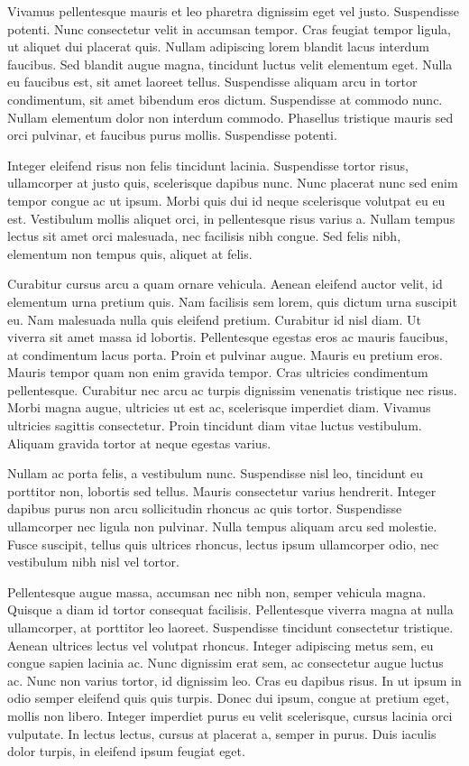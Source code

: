 \documentclass[twoside]{article}
\begin{document}
Vivamus pellentesque mauris et leo pharetra dignissim eget vel justo. Suspendisse potenti. Nunc consectetur velit in accumsan tempor. Cras feugiat tempor ligula, ut aliquet dui placerat quis. Nullam adipiscing lorem blandit lacus interdum faucibus. Sed blandit augue magna, tincidunt luctus velit elementum eget. Nulla eu faucibus est, sit amet laoreet tellus. Suspendisse aliquam arcu in tortor condimentum, sit amet bibendum eros dictum. Suspendisse at commodo nunc. Nullam elementum dolor non interdum commodo. Phasellus tristique mauris sed orci pulvinar, et faucibus purus mollis. Suspendisse potenti.

Integer eleifend risus non felis tincidunt lacinia. Suspendisse tortor risus, ullamcorper at justo quis, scelerisque dapibus nunc. Nunc placerat nunc sed enim tempor congue ac ut ipsum. Morbi quis dui id neque scelerisque volutpat eu eu est. Vestibulum mollis aliquet orci, in pellentesque risus varius a. Nullam tempus lectus sit amet orci malesuada, nec facilisis nibh congue. Sed felis nibh, elementum non tempus quis, aliquet at felis.

Curabitur cursus arcu a quam ornare vehicula. Aenean eleifend auctor velit, id elementum urna pretium quis. Nam facilisis sem lorem, quis dictum urna suscipit eu. Nam malesuada nulla quis eleifend pretium. Curabitur id nisl diam. Ut viverra sit amet massa id lobortis. Pellentesque egestas eros ac mauris faucibus, at condimentum lacus porta. Proin et pulvinar augue. Mauris eu pretium eros. Mauris tempor quam non enim gravida tempor. Cras ultricies condimentum pellentesque. Curabitur nec arcu ac turpis dignissim venenatis tristique nec risus. Morbi magna augue, ultricies ut est ac, scelerisque imperdiet diam. Vivamus ultricies sagittis consectetur. Proin tincidunt diam vitae luctus vestibulum. Aliquam gravida tortor at neque egestas varius.

Nullam ac porta felis, a vestibulum nunc. Suspendisse nisl leo, tincidunt eu porttitor non, lobortis sed tellus. Mauris consectetur varius hendrerit. Integer dapibus purus non arcu sollicitudin rhoncus ac quis tortor. Suspendisse ullamcorper nec ligula non pulvinar. Nulla tempus aliquam arcu sed molestie. Fusce suscipit, tellus quis ultrices rhoncus, lectus ipsum ullamcorper odio, nec vestibulum nibh nisl vel tortor.

Pellentesque augue massa, accumsan nec nibh non, semper vehicula magna. Quisque a diam id tortor consequat facilisis. Pellentesque viverra magna at nulla ullamcorper, at porttitor leo laoreet. Suspendisse tincidunt consectetur tristique. Aenean ultrices lectus vel volutpat rhoncus. Integer adipiscing metus sem, eu congue sapien lacinia ac. Nunc dignissim erat sem, ac consectetur augue luctus ac. Nunc non varius tortor, id dignissim leo. Cras eu dapibus risus. In ut ipsum in odio semper eleifend quis quis turpis. Donec dui ipsum, congue at pretium eget, mollis non libero. Integer imperdiet purus eu velit scelerisque, cursus lacinia orci vulputate. In lectus lectus, cursus at placerat a, semper in purus. Duis iaculis dolor turpis, in eleifend ipsum feugiat eget.
\end{document}
